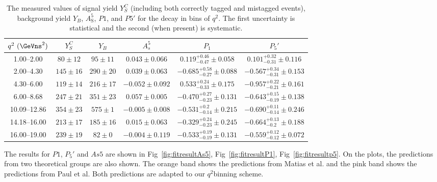 \begin{table*}[!htb]
  \begin{center}
    \caption{The measured values of signal yield $Y^{C}_{S}$ (including both correctly tagged and mistagged events), background yield $Y_{B}$, $A^5_\mathrm{S}$, $P1$, and $P5'$ for the decay \BKpimm in bins of $q^2$.
      The first uncertainty is statistical and the second (when present) is systematic. 
      \label{tab:dataresult}}

    \begin{tabular}{c|ccc|cc}
      \hline
      $q^2~(\GeVns^2)$      & $Y^{C}_{S}$ & $Y_{B}$ & $A_s^5$ & $P_1$ & $P_5'$  \\
      \hline         
      1.00--2.00     & $80  \pm 12$ &    $95 \pm 11$    & $0.043 \pm 0.066$      & $0.119 ^{+ 0.46}_{- 0.47}\pm0.058$  & $0.101 ^{+ 0.32}_{- 0.31}\pm0.116$  \\
      2.00--4.30     & $145 \pm 16$ &    $290\pm 20$    & $0.039 \pm 0.063$      & $-0.685^{+ 0.58}_{- 0.27}\pm0.088$  & $-0.567^{+ 0.34}_{- 0.31}\pm0.153$  \\
      4.30--6.00     & $119 \pm 14$ &    $216\pm 17$    & $-0.052\pm 0.092$      & $0.533 ^{+ 0.24}_{- 0.33}\pm0.175$  & $-0.957^{+ 0.22}_{- 0.21}\pm0.161$  \\
      6.00--8.68     & $247 \pm 21$ &    $351\pm 23$    & $0.057 \pm 0.005$     & $-0.470^{+ 0.27}_{- 0.23}\pm0.131$  & $-0.643^{+ 0.15}_{- 0.19}\pm0.138$  \\
      10.09--12.86   & $354 \pm 23$ &    $575\pm  1$    & $-0.005\pm 0.008$    & $-0.531^{+ 0.2 }_{- 0.14}\pm0.215$  & $-0.690^{+ 0.11}_{- 0.14}\pm0.246$  \\
      14.18--16.00   & $213 \pm 17$ &    $185\pm 16$    & $0.015 \pm 0.063$     & $-0.329^{+ 0.24}_{- 0.23}\pm0.245$  & $-0.664^{+ 0.13}_{- 0.2 }\pm0.188$  \\
      16.00--19.00   & $239 \pm 19$ &    $ 82\pm 0 $    & $-0.004\pm 0.119$    & $-0.533^{+ 0.19}_{- 0.19}\pm0.131$  & $-0.559^{+ 0.12}_{- 0.12}\pm0.072$  \\

      \hline
    \end{tabular}
  \end{center}
\end{table*}

The results for $P1$, $P_5'$ and $As5$ are shown in Fig~\ref{fig:fitresultAs5}, Fig~\ref{fig:fitresultP1}, Fig~\ref{fig:fitresultp5}.
On the plots, the predictions from two theoretical groups are also shown.
The orange band shows the predictions from Matias et al\cite{Genon:Swave}.
and the pink band shows the predictions from Paul et al\cite{Paul2015}.
Both predictions are adapted to our $q^2$binning scheme.

